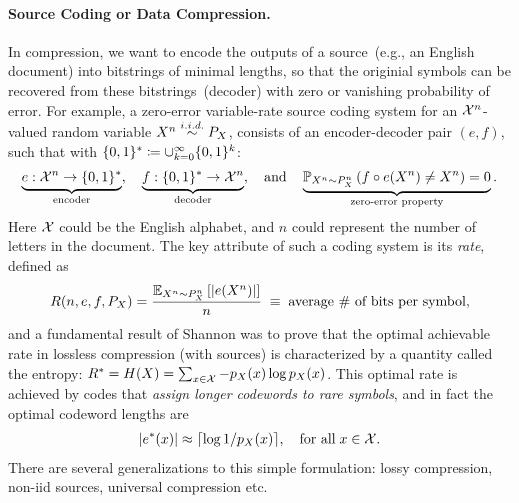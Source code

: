 \documentclass[12pt]{article}
\begin{document}
\paragraph{Source Coding or Data Compression.} In compression, we want to encode the outputs of a source~(e.g., an English document) into bitstrings of minimal lengths, so that the originial symbols can be recovered from these bitstrings~(decoder) with zero or vanishing probability of error. For example, a zero-error variable-rate source coding system for an ${\cal X}^n$-valued random variable $X^n \stackrel{i.i.d.}{\sim} P_X$, consists of an encoder-decoder  pair $(e, f)$, such that with $\{0, 1\}^* \coloneqq \cup_{k = 0}^{\infty} \{0,1\}^k$: 
\begin{align}
\underbrace{e:{\cal X}^n \to \{0, 1\}^*}_{\text{encoder}}, \quad \underbrace{f:\{0,1\}^* \to {\cal X}^n}_{\text{decoder}}, \quad \text{and} \quad \underbrace{\mathbb{P}_{X^n \sim P_X^n}\left( f \circ e(X^n) \neq X^n \right) = 0}_{\text{zero-error property}}. 
\end{align}
Here ${\cal X}$ could be the English alphabet, and $n$ could represent the number of letters in the document. The key attribute of such a coding system is its \emph{rate}, defined as 
\begin{align}
R(n, e, f, P_X) = \frac{\mathbb{E}_{X^n \sim P_X^n}\left[ |e(X^n)| \right] }{n} \;\equiv\; \text{average \# of bits per symbol}, 
\end{align}
and a fundamental result of Shannon was to prove that the optimal achievable rate in lossless compression (with \iid sources) is characterized by a quantity called the entropy: $R^* = H(X) = \sum_{x \in {\cal X}} -p_X(x) \log p_X(x)$. This optimal rate is achieved by codes that \emph{assign longer codewords to rare symbols}, and in fact the optimal codeword lengths are 
\begin{align}
|e^*(x)| \approx \lceil \log 1/p_X(x) \rceil, \quad \text{for all}\; x \in  {\cal X}. 
\end{align}
There are several generalizations to this simple formulation: lossy compression, non-iid sources, universal compression etc. 
\end{document}
